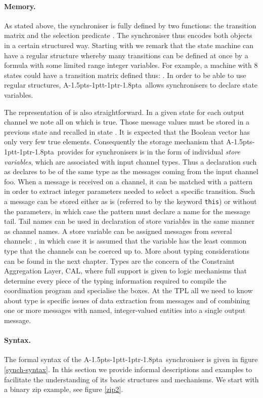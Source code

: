 \documentclass[11pt]{report}
\def\ak{{\textsf{A\kern-1.5pts\kern-1ptt\kern-1ptr\kern-1.8pta}}\kern-2pt{\it K\kern-2ptahn}}
\begin{document}
\paragraph{Memory.}As stated above, the synchroniser is fully defined by two functions: the transition matrix  and the selection predicate . The synchroniser thus encodes both objects in a certain structured way. Starting with  we remark that the state machine can have a regular structure whereby many
transitions can be defined at once by a formula with some limited range integer variables. For example,
a machine with 8 states could have a transition matrix defined thus: . In order to be able to use regular structures, \ak\ allows synchronisers to declare state variables.

The representation of  is also straightforward. In a given state  for each output channel 
we note all  on which  is true. Those message values must be stored in a previous state
and recalled in state . It is expected that the Boolean vector  has only very few
true elements. Consequently the storage mechanism that \ak\ provides for synchronisers is in the form
of individual {\em store variables}, which are associated with input channel types. Thus a declaration
such as  declares  to be of the same type as the messages coming from the input
channel foo. When a message is received on a channel, it can be matched with a pattern in order to extract integer parameters needed to select a specific transition. Such a message can be stored either as is (referred to by the keyword {\tt this}) or without the parameters, in which case the pattern must declare a name for the message tail. Tail names can be used in declaration of store variables in the same manner as channel names.
A store variable can be assigned messages from several channels: ,
in which case it is assumed that the variable has the least common type that the channels can be
coerced up to. More about typing considerations can be found in the next chapter. Types are the concern of the Constraint Aggregation Layer, CAL, where full support is given to logic mechanisms
that determine every piece of the typing information required to compile the coordination program and specialise the boxes. At the TPL all we need to know about type is specific issues of data extraction from
messages and of combining one or more messages with named, integer-valued entities into a single output message.

\paragraph{Syntax.} The formal syntax of the \ak\ synchroniser is given in figure \ref{synch-syntax}. In this section we provide informal descriptions and examples
to facilitate the understanding of its basic structures and mechanisms. We start with a binary zip example,
see figure \ref{zip2}.
\end{document}

